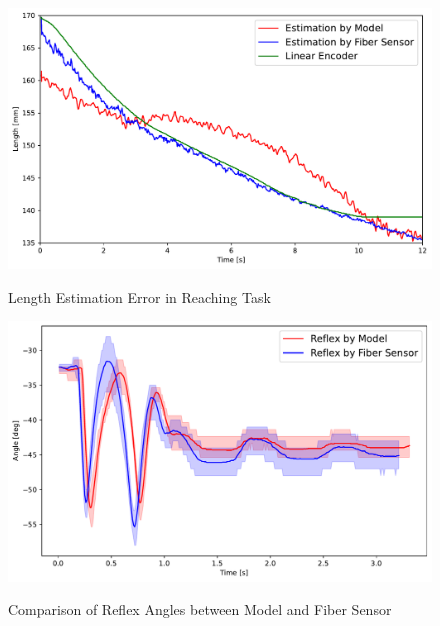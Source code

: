 \begin{figure}[t]
    \centering
    \begin{minipage}[H]{\textwidth} %
        \begin{minipage}[H]{0.48\textwidth} %
            \centering
            \includegraphics[width=\columnwidth]{fig/reaching_error.pdf}
            \caption{Length Estimation Error in Reaching Task}
            \label{fig:reaching_error}
            \vspace{1em}
            \includegraphics[width=\columnwidth]{fig/time_vs_angle_model_sensor.pdf}
            \caption{Comparison of Reflex Angles between Model and Fiber Sensor}
            \label{fig:reflex_angle}
        \end{minipage}
        \hfill
        \begin{minipage}[H]{0.48\textwidth} %
            \centering

\end{minipage}
\end{minipage}
\end{figure}
